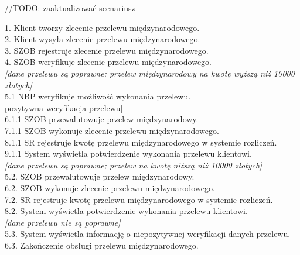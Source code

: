 //TODO: zaaktualizować scenariusz
\begin{flushleft}
1. Klient tworzy zlecenie przelewu międzynarodowego.\\
2. Klient wysyła zlecenie przelewu międzynarodowego.\\
3. SZOB rejestruje zlecenie przelewu międzynarodowego.\\
4. SZOB weryfikuje zlecenie przelewu międzynarodowego.\\
\textit{{[}dane przelewu są poprawne; przelew międzynarodowy na kwotę wyższą niż 10000 złotych{]}}\\
\hspace{1ex}5.1 NBP weryfikuje możliwość wykonania przelewu.\\
\hspace{1ex}{[}pozytywna weryfikacja przelewu{]}\\
\hspace{2ex}6.1.1 SZOB przewalutowuje przelew międzynarodowy.\\
\hspace{2ex}7.1.1 SZOB wykonuje zlecenie przelewu międzynarodowego.\\
\hspace{2ex}8.1.1 SR rejestruje kwotę przelewu międzynarodowego w systemie rozliczeń.\\
\hspace{2ex}9.1.1 System wyświetla potwierdzenie wykonania przelewu klientowi.\\
\hspace{2ex}\textit{{[}dane przelewu są poprawne; przelew na kwotę niższą niż 10000 złotych{]}}\\
\hspace{1ex}5.2. SZOB przewalutowuje przelew międzynarodowy.\\
\hspace{1ex}6.2. SZOB wykonuje zlecenie przelewu międzynarodowego.\\
\hspace{1ex}7.2. SR rejestruje kwotę przelewu międzynarodowego w systemie rozliczeń.\\
\hspace{1ex}8.2. System wyświetla potwierdzenie wykonania przelewu klientowi.\\
\textit{{[}dane przelewu nie są poprawne{]}}\\
\hspace{1ex}5.3. System wyświetla informację o niepozytywnej weryfikacji danych przelewu.\\
\hspace{1ex}6.3. Zakończenie obsługi przelewu międzynarodowego.\\

\end{flushleft}
